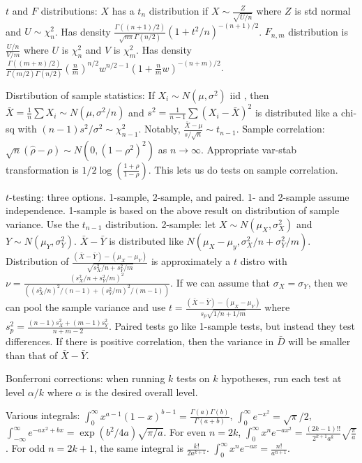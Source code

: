 \documentclass{article}
\begin{document}
$t$ and $F$ distributions: $X$ has a $t_n$ distribution if $X\sim\frac{Z}{\sqrt{U/n}}$ where $Z$ is std normal and $U\sim\chi^2_n$. Has density $\frac{\Gamma((n+1)/2)}{\sqrt{n\pi}\Gamma(n/2)}(1+t^2/n)^{-(n+1)/2}$. $F_{n,m}$ distribution is $\frac{U/n}{V/m}$ where $U$ is $\chi^2_n$ and $V$ is $\chi^2_{m}$. Has density $\frac{\Gamma((m+n)/2)}{\Gamma(m/2)\Gamma(n/2)}\left(\frac{n}{m}\right)^{n/2}w^{n/2-1}(1+\frac{n}{m}w)^{-(n+m)/2}$.

Disrtibution of sample statistics: If $X_i\sim N(\mu,\sigma^2)$ iid , then $\bar{X}=\frac{1}{n}\sum X_i\sim N(\mu,\sigma^2/n)$ and $s^2=\frac{1}{n-1}\sum(X_i-\bar{X})^2$ is distributed like a chi-sq with $(n-1)s^2/\sigma^2\sim\chi^2_{n-1}$. Notably, $\frac{\bar{X}-\mu}{s/\sqrt{n}}\sim t_{n-1}$. Sample correlation: $\sqrt{n}(\hat{\rho}-\rho)\sim N(0,(1-\rho^2)^2)$ as $n\to\infty$. Appropriate var-stab transformation is $1/2\log\left(\frac{1+\rho}{1-\rho}\right)$. This lets us do tests on sample correlation. 

$t$-testing: three options. 1-sample, 2-sample, and paired. 1- and 2-sample assume independence. 1-sample is based on the above result on distribution of sample variance. Use the $t_{n-1}$ distribution. 2-sample: let $X\sim N(\mu_X,\sigma_X^2)$ and $Y\sim N(\mu_Y,\sigma_Y^2)$. $\bar{X}-\bar{Y}$ is distributed like $N(\mu_X-\mu_y,\sigma_X^2/n+\sigma_Y^2/m)$. Distribution of $\frac{(\bar{X}-\bar{Y})-(\mu_X-\mu_Y)}{\sqrt{s_X^2/n+s_Y^2/m}}$ is approximately a $t$ distro with $\nu=\frac{(s_X^2/n+s_Y^2/m)^2}{((s_X^2/n)^2/(n-1)+(s_Y^2/m)^2/(m-1))}$. If we can assume that $\sigma_X=\sigma_Y$, then we can pool the sample variance and use $t=\frac{(\bar{X}-\bar{Y})-(\mu_X-\mu_Y)}{s_p\sqrt{1/n+1/m}}$ where $s_p^2=\frac{(n-1)s_X^2+(m-1)s_Y^2}{n+m-2}$. Paired tests go like 1-sample tests, but instead they test differences. If there is positive correlation, then the variance in $\bar{D}$ will be smaller than that of $\bar{X}-\bar{Y}$.

Bonferroni corrections: when running $k$ tests on $k$ hypotheses, run each test at level $\alpha/k$ where $\alpha$ is the desired overall level.

Various integrals: $\int_0^\infty x^{a-1}(1-x)^{b-1}=\frac{\Gamma(a)\Gamma(b)}{\Gamma(a+b)}$, $\int_0^\infty e^{-x^2}=\sqrt{\pi}/2$, $\int_{-\infty}^\infty e^{-ax^2+bx}=\exp(b^2/4a)\sqrt{\pi/a}$. For even $n=2k$, $\int_0^\infty x^ne^{-ax^2}=\frac{(2k-1)!!}{2^{k+1}a^k}\sqrt{\frac{\pi}{a}}$. For odd $n=2k+1$, the same integral is $\frac{k!}{2a^{k+1}}$. $\int_0^\infty x^ne^{-ax}=\frac{n!}{a^{n+1}}$. 
\end{document}
